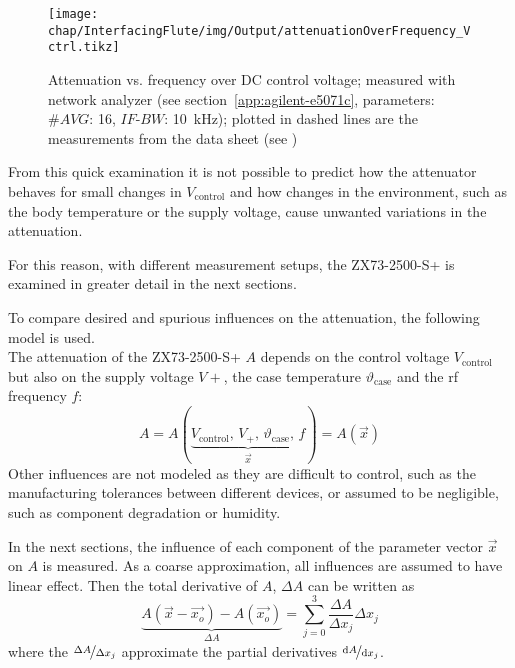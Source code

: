 \begin{figure}[tb]
	\centering
	\texttt{[image: chap/InterfacingFlute/img/Output/attenuationOverFrequency\_Vctrl.tikz]}
	\caption[Attenuation vs. frequency plot of the attenuator]{Attenuation vs. frequency over DC control voltage; measured with network analyzer (see section~\ref{app:agilent-e5071c}, parameters: $\#AVG$: 16, $IF\text{-}BW$: \SI{10}{\kHz}); plotted in dashed lines are the measurements from the data sheet (see \cite[p.~2]{mini-circuitsZX732500VoltageVariable})}
	\label{fig:interfacingFlute_atteneval-overview-NA}
\end{figure}

From this quick examination it is not possible to predict how the attenuator behaves for small changes in $V_\text{control}$ and how changes in the environment, such as the body temperature or the supply voltage, cause unwanted variations in the attenuation. 

For this reason, with different measurement setups, the ZX73-2500-S+ is examined in greater detail in the next sections.

To compare desired and spurious influences on the attenuation, the following model is used.\\
The attenuation of the ZX73-2500-S+ $A$ depends on the control voltage $V_\text{control}$ but also on the supply voltage $V+$, the case temperature $\vartheta_\text{case}$ and the \gls{rf} frequency $f$:
\begin{equation}
A=A(\underbrace{V_\text{control},\,V_+,\,\vartheta_\text{case},\,f}_{\vec{x}}) = A\left(\vec{x}\right)
\end{equation}
Other influences are not modeled as they are difficult to control, such as the manufacturing tolerances between different devices, or assumed to be negligible, such as component degradation or humidity.

In the next sections, the influence of each component of the parameter vector $\vec{x}$ on $A$ is measured. As a coarse approximation, all influences are assumed to have linear effect. Then the total derivative of $A$, $\Delta A$ can be written as
\begin{equation}\label{eq:interfacingFlute_linearApprox}
\underbrace{A(\vec{x}-\vec{x_o})-A(\vec{x_o})}_{\Delta A} = \sum_{j=0}^{3} \frac{\Delta A}{\Delta x_j} \Delta x_j
\end{equation}
where the $\nicefrac{\Delta A}{\Delta x_j}$ approximate the partial derivatives $\nicefrac{\text{d}{A}}{\text{d}{x_j}}$.

